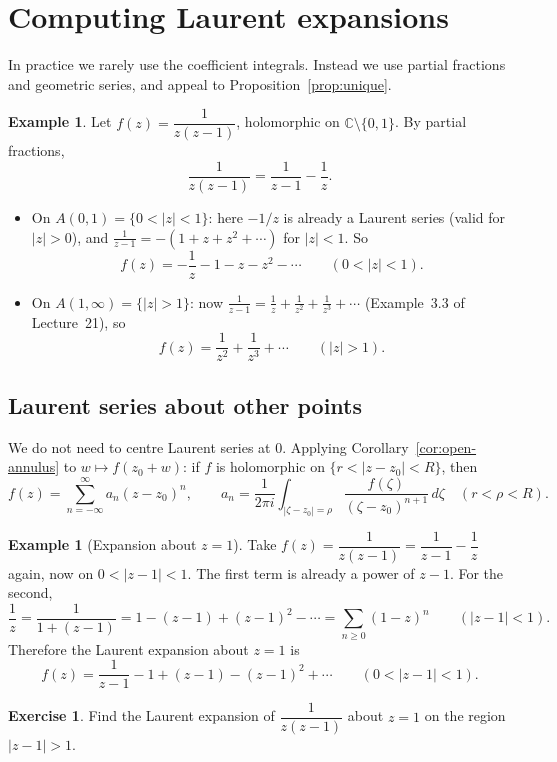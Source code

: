 \documentclass[11pt]{article}
\theoremstyle{plain}
\theoremstyle{definition}
\newtheorem{example}[theorem]{Example}
\newtheorem{exercise}[theorem]{Exercise}
\theoremstyle{boldremark}
\theoremstyle{remark}
\numberwithin{equation}{section}
\newcommand{\C}{\mathbb{C}}
\newenvironment{lecturefigure}
 {\par\addvspace{0.25em}\begingroup\setlength{\parskip}{0pt}\centering}
 {\par\endgroup\addvspace{0.25em}}
\begin{document}
\section{Computing Laurent expansions}
In practice we rarely use the coefficient integrals. Instead we use
partial fractions and geometric series, and appeal to
Proposition~\ref{prop:unique}.

\begin{example}\label{ex:zz1-at-0}
Let $f(z)=\dfrac{1}{z(z-1)}$, holomorphic on $\C\setminus\{0,1\}$. By
partial fractions,
\[
 \frac{1}{z(z-1)}=\frac{1}{z-1}-\frac1z.
\]
\begin{itemize}
 \item On $A(0,1)=\{0<|z|<1\}$: here $-1/z$ is already a Laurent series
 (valid for $|z|>0$), and $\frac{1}{z-1}=-(1+z+z^2+\cdots)$ for $|z|<1$. So
 \[
  f(z)=-\frac1z-1-z-z^2-\cdots\qquad(0<|z|<1).
 \]
 \item On $A(1,\infty)=\{|z|>1\}$: now
 $\frac{1}{z-1}=\frac1z+\frac1{z^2}+\frac1{z^3}+\cdots$
 (Example~3.3 of Lecture~21), so
 \[
  f(z)=\frac1{z^2}+\frac1{z^3}+\cdots\qquad(|z|>1).
 \]
\end{itemize}
\begin{lecturefigure}
\end{lecturefigure}
\end{example}

\subsection{Laurent series about other points}
We do not need to centre Laurent series at $0$. Applying
Corollary~\ref{cor:open-annulus} to $w\mapsto f(z_0+w)$: if $f$ is
holomorphic on $\{r<|z-z_0|<R\}$, then
\[
 f(z)=\sum_{n=-\infty}^{\infty}a_n(z-z_0)^n,\qquad
 a_n=\frac{1}{2\pi i}\int_{|\zeta-z_0|=\rho}
 \frac{f(\zeta)}{(\zeta-z_0)^{n+1}}\,d\zeta\quad(r<\rho<R).
\]

\begin{example}[Expansion about $z=1$]
Take $f(z)=\dfrac{1}{z(z-1)}=\dfrac{1}{z-1}-\dfrac1z$ again, now on
$0<|z-1|<1$. The first term is already a power of $z-1$. For the second,
\[
 \frac1z=\frac{1}{1+(z-1)}=1-(z-1)+(z-1)^2-\cdots
 =\sum_{n\geq0}(1-z)^n\qquad(|z-1|<1).
\]
Therefore the Laurent expansion about $z=1$ is
\[
 f(z)=\frac{1}{z-1}-1+(z-1)-(z-1)^2+\cdots\qquad(0<|z-1|<1).
\]
\end{example}

\begin{exercise}
Find the Laurent expansion of $\dfrac{1}{z(z-1)}$ about $z=1$ on the
region $|z-1|>1$.
\end{exercise}
\end{document}
